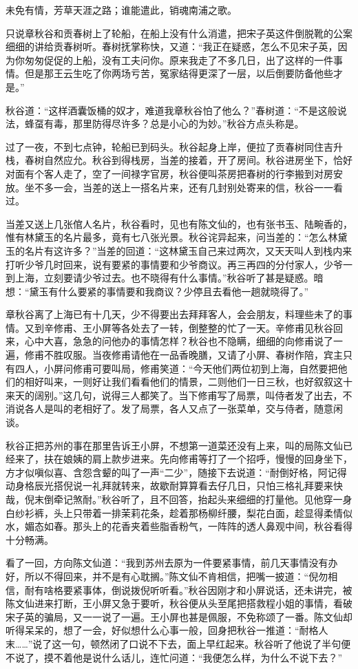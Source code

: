 \documentclass[12pt,UTF8]{ctexbook}
\begin{document}
{{{未免有情，芳草天涯之路；谁能遣此，销魂南浦之歌。

只说章秋谷和贡春树上了轮船，在船上没有什么消遣，把宋子英这件倒脱靴的公案细细的讲给贡春树听。春树抚掌称快，又道：“我正在疑惑，怎么不见宋子英，因为你匆匆促促的上船，没有工夫问你。原来我走了不多几日，出了这样的一件事情。但是那王云生吃了你两场亏苦，冤家结得更深了一层，以后倒要防备他些才是。”

秋谷道：“这样酒囊饭桶的奴才，难道我章秋谷怕了他么？”春树道：“不是这般说法，蜂虿有毒，那里防得尽许多？总是小心的为妙。”秋谷方点头称是。

过了一夜，不到七点钟，轮船已到码头。秋谷起身上岸，便拉了贡春树同住吉升栈，春树自然应允。秋谷到得栈房，当差的接着，开了房间。秋谷进房坐下，恰好对面有个客人走了，空了一间禄字官房，秋谷便叫茶房把春树的行李搬到对房安放。坐不多一会，当差的送上一搭名片来，还有几封别处寄来的信，秋谷一一看过。

当差又送上几张倌人名片，秋谷看时，见也有陈文仙的，也有张书玉、陆畹香的，惟有林黛玉的名片最多，竟有七八张光景。秋谷诧异起来，问当差的：“怎么林黛玉的名片有这许多？”当差的回道：“这林黛玉自己来过两次，又天天叫人到栈内来打听少爷几时回来，说有要紧的事情要和少爷商议。再三再四的分付家人，少爷一到上海，立刻要请少爷过去。也不晓得有什么事情。”秋谷听了甚是疑惑。暗想：“黛玉有什么要紧的事情要和我商议？少停且去看他一趟就晓得了。”

章秋谷离了上海已有十几天，少不得要出去拜拜客人，会会朋友，料理些未了的事情。又到辛修甫、王小屏等各处去了一转，倒整整的忙了一天。辛修甫见秋谷回来，心中大喜，急急的问他办的事情怎样？秋谷也不隐瞒，细细的向修甫说了一遍，修甫不胜叹服。当夜修甫请他在一品香晚膳，又请了小屏、春树作陪，宾主只有四人，小屏问修甫可要叫局，修甫笑道：“今天他们两位初到上海，自然要把他们的相好叫来，一则好让我们看看他们的情景，二则他们一日三秋，也好叙叙这十来天的阔别。”这几句，说得三人都笑了。当下修甫写了局票，叫侍者发了出去，不消说各人是叫的老相好了。发了局票，各人又点了一张菜单，交与侍者，随意闲谈。

秋谷正把苏州的事在那里告诉王小屏，不想第一道菜还没有上来，叫的局陈文仙已经来了，扶在娘姨的肩上款步进来。先向修甫等打了一个招呼，慢慢的回身坐下，方才似嗔似喜、含怨含颦的叫了一声“二少”，随接下去说道：“耐倒好格，阿记得动身格辰光搭倪说一礼拜就转来，故歇耐算算看去仔几日，只怕三格礼拜要来快哉，倪末倒牵记煞耐。”秋谷听了，且不回答，抬起头来细细的打量他。见他穿一身白纱衫裤，头上只带着一排茉莉花条，趁着那杨柳纤腰，梨花白面，趁显得柔情似水，媚态如春。那头上的花香夹着些脂香粉气，一阵阵的透人鼻观中间，秋谷看得十分畅满。

看了一回，方向陈文仙道：“我到苏州去原为一件要紧事情，前几天事情没有办好，所以不得回来，并不是有心耽搁。”陈文仙不肯相信，把嘴一披道：“倪勿相信，耐有啥格要紧事体，倒说拨倪听听看。”秋谷因刚才和小屏说话，还未讲完，被陈文仙进来打断，王小屏又急于要听，秋谷便从头至尾把搭救程小姐的事情，看破宋子英的骗局，又一一说了一遍。王小屏也甚是佩服，不免称颂了一番。陈文仙却听得呆呆的，想了一会，好似想什么心事一般，回身把秋谷一推道：“耐格人末……”说了这一句，顿然闭了口说不下去，面上早红起来。秋谷听了他说了半句便不说了，摸不着他是说什么话儿，连忙问道：“我便怎么样，为什么不说下去？”

}}}
\end{document}
